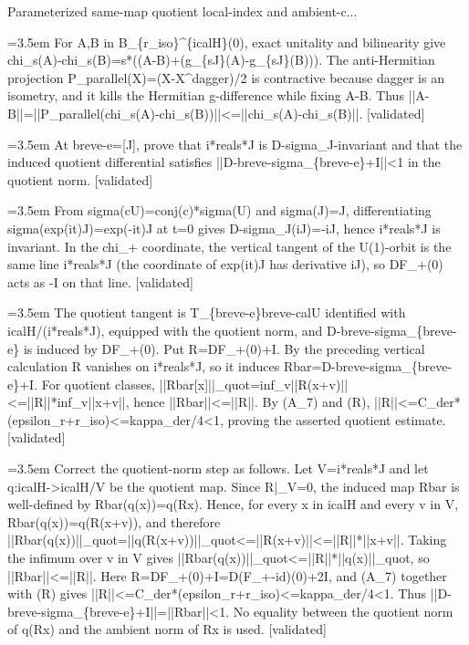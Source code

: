 \documentclass{article}
\newcommand{\step}[1]{\par\noindent\hangindent=3.5em\hangafter=1%
  \makebox[3.5em][l]{\textbf{#1.}}}
\newcommand{\steptag}[1]{\hfill{\small\textsf{[#1]}}}
\begin{document}
\begin{proofbox}{Parameterized same-map quotient local-index and ambient-c...}
\step{1.2.3} For A,B in B\_\{r\_iso\}\textasciicircum{}\{icalH\}(0), exact unitality and bilinearity give chi\_s(A)-chi\_s(B)=s*((A-B)+(g\_\{sJ\}(A)-g\_\{sJ\}(B))). The anti-Hermitian projection P\_parallel(X)=(X-X\textasciicircum{}dagger)/2 is contractive because dagger is an isometry, and it kills the Hermitian g-difference while fixing A-B. Thus ||A-B||=||P\_parallel(chi\_s(A)-chi\_s(B))||<=||chi\_s(A)-chi\_s(B)||. \steptag{validated} \\[4pt]
\step{1.3} At breve-e=[J], prove that i*reals*J is D-sigma\_J-invariant and that the induced quotient differential satisfies ||D-breve-sigma\_\{breve-e\}+I||<1 in the quotient norm. \steptag{validated} \\[6pt]
\step{1.3.1} From sigma(cU)=conj(c)*sigma(U) and sigma(J)=J, differentiating sigma(exp(it)J)=exp(-it)J at t=0 gives D-sigma\_J(iJ)=-iJ, hence i*reals*J is invariant. In the chi\_+ coordinate, the vertical tangent of the U(1)-orbit is the same line i*reals*J (the coordinate of exp(it)J has derivative iJ), so DF\_+(0) acts as -I on that line. \steptag{validated} \\[4pt]
\step{1.3.2} The quotient tangent is T\_\{breve-e\}breve-calU identified with icalH/(i*reals*J), equipped with the quotient norm, and D-breve-sigma\_\{breve-e\} is induced by DF\_+(0). Put R=DF\_+(0)+I. By the preceding vertical calculation R vanishes on i*reals*J, so it induces Rbar=D-breve-sigma\_\{breve-e\}+I. For quotient classes, ||Rbar[x]||\_quot=inf\_v||R(x+v)||<=||R||*inf\_v||x+v||, hence ||Rbar||<=||R||. By (A\_7) and (R), ||R||<=C\_der*(epsilon\_r+r\_iso)<=kappa\_der/4<1, proving the asserted quotient estimate. \steptag{validated} \\[6pt]
\step{1.3.2.1} Correct the quotient-norm step as follows. Let V=i*reals*J and let q:icalH->icalH/V be the quotient map. Since R|\_V=0, the induced map Rbar is well-defined by Rbar(q(x))=q(Rx). Hence, for every x in icalH and every v in V, Rbar(q(x))=q(R(x+v)), and therefore ||Rbar(q(x))||\_quot=||q(R(x+v))||\_quot<=||R(x+v)||<=||R||*||x+v||. Taking the infimum over v in V gives ||Rbar(q(x))||\_quot<=||R||*||q(x)||\_quot, so ||Rbar||<=||R||. Here R=DF\_+(0)+I=D(F\_+-id)(0)+2I, and (A\_7) together with (R) gives ||R||<=C\_der*(epsilon\_r+r\_iso)<=kappa\_der/4<1. Thus ||D-breve-sigma\_\{breve-e\}+I||=||Rbar||<1. No equality between the quotient norm of q(Rx) and the ambient norm of Rx is used. \steptag{validated} \\[4pt]

\end{proofbox}
\end{document}
